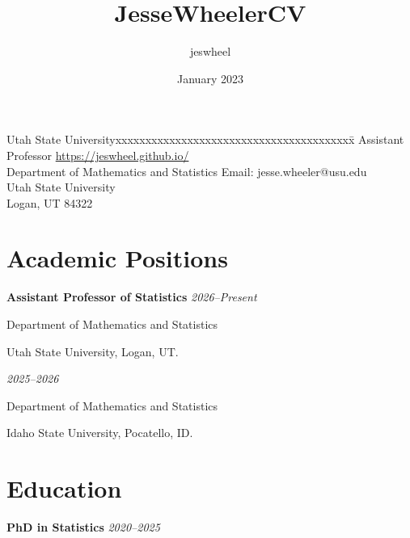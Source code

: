\documentclass[11pt]{article}
\title{JesseWheelerCV}
\author{jeswheel}
\date{January 2023}
\begin{document}
\thispagestyle{empty}  %

\rule{0mm}{1mm}
\vspace{-20mm}


\vspace{1mm}

\rule{0mm}{1mm}


\begin{tabbing}
Utah State Universityxxxxxxxxxxxxxxxxxxxxxxxxxxxxxxxxxxxxxxxx\= \kill
Assistant Professor \>
{\url{https://jeswheel.github.io/}}\\
Department of Mathematics and Statistics \>  %
Email: {jesse.wheeler@usu.edu}
\\
Utah State University\> %
\\
Logan, UT 84322 \>
\end{tabbing}

\section*{Academic Positions}

{\bf Assistant Professor of Statistics} \hfill {\textit{2026--Present}}

Department of Mathematics and Statistics

Utah State University, Logan, UT.


\vspace{2mm}

 \hfill {\textit{2025--2026}}

Department of Mathematics and Statistics

Idaho State University, Pocatello, ID.

\vspace{2mm}

\section*{Education}

{\bf PhD in Statistics} \hfill {\textit{2020--2025}}
\end{document}
